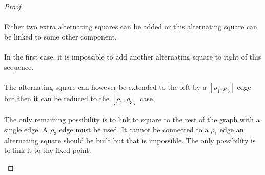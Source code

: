 \begin{proof}
\begin{figure}[H]
\begin{center}
\begin{tikzpicture}[scale=.8]
    \end{tikzpicture}
    \caption{}
  \end{center}
\end{figure}

\paragraph{}
Either two extra alternating squares can be added or this alternating square can be linked to some other component.

\paragraph{}
In the first case, it is impossible to add another alternating square to right of this sequence.

\paragraph{}
The alternating square can however be extended to the left by a $[\rho_1, \rho_3]$ edge but then it can be reduced to the $[\rho_1, \rho_3]$ case.

\paragraph{}
The only remaining possibility is to link to square to the rest of the graph with a single edge. A $\rho_3$ edge must be used. It cannot be connected to a $\rho_1$ edge an alternating square should be built but that is impossible. The only possibility is to link it to the fixed point.

\begin{figure}[H]
  \begin{center}
\end{center}
\end{figure}
\end{proof}
